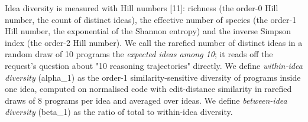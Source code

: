 \documentclass[11pt,letterpaper]{article}
\begin{document}
Idea diversity is measured with Hill numbers [11]: richness (the order-0 Hill number, the count of distinct ideas), the effective number of species (the order-1 Hill number, the exponential of the Shannon entropy) and the inverse Simpson index (the order-2 Hill number). We call the rarefied number of distinct ideas in a random draw of 10 programs the \emph{expected ideas among 10}; it reads off the request's question about "10 reasoning trajectories" directly. We define \emph{within-idea diversity} (alpha\_1) as the order-1 similarity-sensitive diversity of programs inside one idea, computed on normalised code with edit-distance similarity in rarefied draws of 8 programs per idea and averaged over ideas. We define \emph{between-idea diversity} (beta\_1) as the ratio of total to within-idea diversity.

\begingroup\scriptsize
\setlength{\tabcolsep}{2.0pt}
\end{document}
